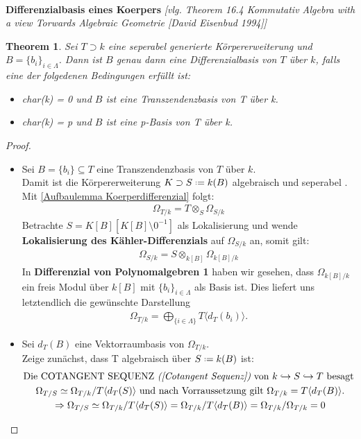 \documentclass[10pt,a4paper]{report}
\newcommand{\comment}[1]{}
\newcommand{\ModulsOfDifferenzials}{Kommutativ Algebra with a view Torwards Algebraic Geometrie [David Eisenbud 1994]}
\newcounter{Aussage}[chapter]
\newtheorem{theorem}[Aussage]{Theorem}
\newcommand{\divR}[2]{\Omega_{#1/#2}}
\newcommand{\divf}[1]{d_{#1}}
\newcommand{\Tensor}[3]{#1 \otimes_{#2} #3}
\newcommand{\lok}[2]{#1 [#2^{-1}]}
\newcommand*{\defeq}{\mathrel{\vcenter{\baselineskip0.5ex \lineskiplimit0pt
                     \hbox{\scriptsize.}\hbox{\scriptsize.}}}%
                     =}
\newcommand{\Verz}[1]{\langle #1 \rangle}
\begin{document}
\ \\
\textbf{Differenzialbasis eines Koerpers} \textit{[vlg. Theorem 16.4 \ModulsOfDifferenzials]}
\begin{theorem}\comment{\label{Differenzialbasis eines Koerpers}}
Sei $T \supset k$ eine seperabel generierte Körpererweiterung und $B = \lbrace b_i \rbrace_{i \in \Lambda}$. Dann ist $B$ genau dann eine Differenzialbasis von $T$ über $k$, falls eine der folgedenen Bedingungen erfüllt ist:
\begin{itemize}
\item[\textbf{1.}] char(k) = 0 und $B$ ist eine Transzendenzbasis von T über k.
\item[\textbf{2.}] char(k) = p und $B$ ist eine p-Basis von T über k.
\end{itemize}
\end{theorem}
\begin{proof}
\ \\
\begin{itemize}
\item[\underline{\textbf{1.}\glqq$\Leftarrow$\grqq:}] Sei $B = \lbrace b_i \rbrace \subseteq T$ eine Transzendenzbasis von $T$ über $k$.\\
Damit ist die Körpererweiterung $K \supset S \defeq k(B)$ algebraisch und seperabel \comment{ mit \label{*Transzendenzbasisdef}}. Mit \cref{Aufbaulemma Koerperdifferenzial} folgt:
\begin{gather*}
\divR{T}{k} = \Tensor{T}{S}{\divR{S}{k}}
\end{gather*}
Betrachte $S = \lok{K[B]}{K[B] \setminus 0}$ als Lokalisierung und wende \textbf{Lokalisierung des Kähler-Differenzials} \comment{\cref{Lokalisierung des Kähler-Differenzials}} auf $\divR{S}{k}$ an, somit gilt:
\begin{gather*}
\divR{S}{k} = \Tensor{S}{k[B]}{\divR{k[B]}{k}}
\end{gather*}
In \textbf{Differenzial von Polynomalgebren 1} \comment{\label{*Differenzial von Polynomalgebren brauche ich für unendliche Mengen Lambda}\cref{Differenzial von Polynomalgebren 1}} haben wir gesehen, dass $\divR{k[B]}{k}$ ein freis Modul über $k[B]$ mit $\lbrace b_i \rbrace_{i \in \Lambda}$ als Basis ist. Dies liefert uns letztendlich die gewünschte Darstellung
\begin{gather*}
\divR{T}{k} = \bigoplus_{\lbrace i \in \Lambda \rbrace} T \langle \divf{T}(b_i) \rangle .
\end{gather*}
\item[\underline{\textbf{1.}\glqq$\Rightarrow$\grqq:}]Sei $\divf{T}(B)$ eine Vektorraumbasis von $\divR{T}{k}$.\\
Zeige zunächst, dass T algebraisch über $S \defeq k(B)$ ist:
\begin{gather*}
\text{Die COTANGENT SEQUENZ \textit{(\cref{Cotangent Sequenz})} von $k \hookrightarrow S \hookrightarrow T$ besagt }\\
\divR{T}{S} \simeq \divR{T}{k}/T \Verz{\divf{T}(S)} \text{ und nach Vorraussetzung gilt } \divR{T}{k} = T \Verz{\divf{T}(B)}.
\\
\Rightarrow \divR{T}{S} \simeq \divR{T}{k}/T\Verz{\divf{T}(S)} = \divR{T}{k}/T\Verz{\divf{T}(B)}=
\divR{T}{k}/\divR{T}{k} = 0
\end{gather*}


\end{itemize}
\end{proof}
\end{document}
